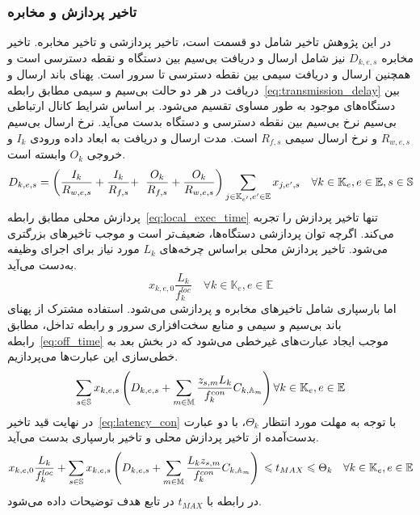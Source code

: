 \subsubsection{تاخیر پردازش و مخابره} \label{subsubsec:latency}
در این پژوهش تاخیر شامل دو قسمت است، تاخیر پردازشی و تاخیر مخابره. تاخیر مخابره $D_{k,e,s}$ نیز شامل ارسال و دریافت بی‌سیم بین دستگاه و نقطه دسترسی است و همچنین ارسال و دریافت سیمی بین نقطه دسترسی تا سرور است. پهنای باند ارسال و دریافت در هر دو حالت بی‌سیم و سیمی مطابق رابطه~\eqref{eq:transmission_delay} بین دستگاه‌های موجود به طور مساوی تقسیم می‌شود. بر اساس شرایط کانال ارتباطی بی‌سیم نرخ بی‌سیم بین نقطه دسترسی و دستگاه بدست می‌آید. نرخ ارسال بی‌سیم $R_{w,e,s}$ و نرخ ارسال سیمی $R_{f,s}$ است. مدت ارسال و دریافت به ابعاد داده ورودی $I_k$ و خروجی $O_k$ وابسته است.
\begin{equation} \label{eq:transmission_delay}
    D_{k,e,s} = \left(\frac{I_k}{R_{w,e,s}} + \frac{I_k}{R_{f,s}} + \right. \\ \left. \frac{O_k}{R_{f,s}} + \frac{O_k}{R_{w,e,s}} \right) \sum_{j \in \mathbb{K}_{e'}, e' \in \mathbb{E}} x_{j,e',s}  \quad \forall k \in \mathbb{K}_e, e \in \mathbb{E}, s \in \mathbb{S}
\end{equation}
پردازش محلی مطابق رابطه~\eqref{eq:local_exec_time} تنها تاخیر پردازش را تجربه می‌کند. اگرچه توان پردازشی دستگاه‌ها، ضعیف‌تر است و موجب تاخیرهای بزرگتری می‌شود. تاخیر پردازش محلی براساس چرخه‌های $L_k$ مورد نیاز برای اجرای وظیفه به‌دست می‌آید.
\begin{equation} \label{eq:local_exec_time}
    x_{k,e,0}\frac{L_k}{f^{loc}_k} \quad \forall k \in \mathbb{K}_e, e \in \mathbb{E}
\end{equation}
اما بارسپاری شامل تاخیرهای مخابره و پردازشی می‌شود. استفاده مشترک از پهنای باند بی‌سیم و سیمی و منابع سخت‌افزاری سرور و رابطه تداخل، مطابق رابطه~\eqref{eq:off_time} موجب ایجاد عبارت‌های غیرخطی می‌شود که در بخش بعد به خطی‌سازی این عبارت‌ها می‌پردازیم.
\begin{equation} \label{eq:off_time}
    \sum_{s \in \mathbb{S}} x_{k,e,s} \left(D_{k,e,s} + \sum_{m \in \mathbb{M}} \frac{z_{s,m} L_k}{f^{con}_k} C_{k,\mathbb{A}_m}\right) \\ \forall k \in \mathbb{K}_e, e \in \mathbb{E}
\end{equation}
در نهایت قید تاخیر~\eqref{eq:latency_con} با توجه به مهلت مورد انتظار $\Theta_k$، با دو عبارت بدست‌آمده از تاخیر پردازش محلی و تاخیر بارسپاری بدست می‌آید.
\begin{equation} \label{eq:latency_con}
    x_{k,e,0}\frac{L_k}{f^{loc}_k} + \sum_{s \in \mathbb{S}} x_{k,e,s} \left(D_{k,e,s} + \sum_{m \in \mathbb{M}}\frac{L_k z_{s,m}}{f^{con}_k} C_{k,\mathbb{A}_m}\right) \\ \leq t_{MAX} \leq \Theta_k \quad \forall k \in \mathbb{K}_e, e \in \mathbb{E}
\end{equation}
در رابطه با $t_{MAX}$ در تابع هدف توضیحات داده می‌شود.

